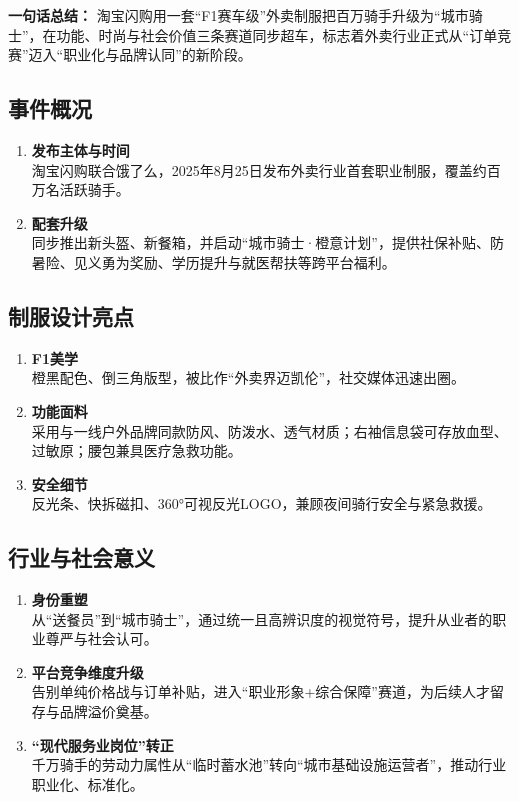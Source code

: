 \textbf{一句话总结：}  
淘宝闪购用一套“F1赛车级”外卖制服把百万骑手升级为“城市骑士”，在功能、时尚与社会价值三条赛道同步超车，标志着外卖行业正式从“订单竞赛”迈入“职业化与品牌认同”的新阶段。

\subsection{事件概况}
\begin{enumerate}[leftmargin=*, nosep]
    \item \textbf{发布主体与时间}  \\
    淘宝闪购联合饿了么，2025年8月25日发布外卖行业首套职业制服，覆盖约百万名活跃骑手。
    \item \textbf{配套升级}  \\
    同步推出新头盔、新餐箱，并启动“城市骑士·橙意计划”，提供社保补贴、防暑险、见义勇为奖励、学历提升与就医帮扶等跨平台福利。
\end{enumerate}

\subsection{制服设计亮点}
\begin{enumerate}[leftmargin=*, nosep]
    \item \textbf{F1美学}  \\
    橙黑配色、倒三角版型，被比作“外卖界迈凯伦”，社交媒体迅速出圈。
    \item \textbf{功能面料}  \\
    采用与一线户外品牌同款防风、防泼水、透气材质；右袖信息袋可存放血型、过敏原；腰包兼具医疗急救功能。
    \item \textbf{安全细节}  \\
    反光条、快拆磁扣、360°可视反光LOGO，兼顾夜间骑行安全与紧急救援。
\end{enumerate}

\subsection{行业与社会意义}
\begin{enumerate}[leftmargin=*, nosep]
    \item \textbf{身份重塑}  \\
    从“送餐员”到“城市骑士”，通过统一且高辨识度的视觉符号，提升从业者的职业尊严与社会认可。
    \item \textbf{平台竞争维度升级}  \\
    告别单纯价格战与订单补贴，进入“职业形象+综合保障”赛道，为后续人才留存与品牌溢价奠基。
    \item \textbf{“现代服务业岗位”转正}  \\
    千万骑手的劳动力属性从“临时蓄水池”转向“城市基础设施运营者”，推动行业职业化、标准化。
\end{enumerate}


